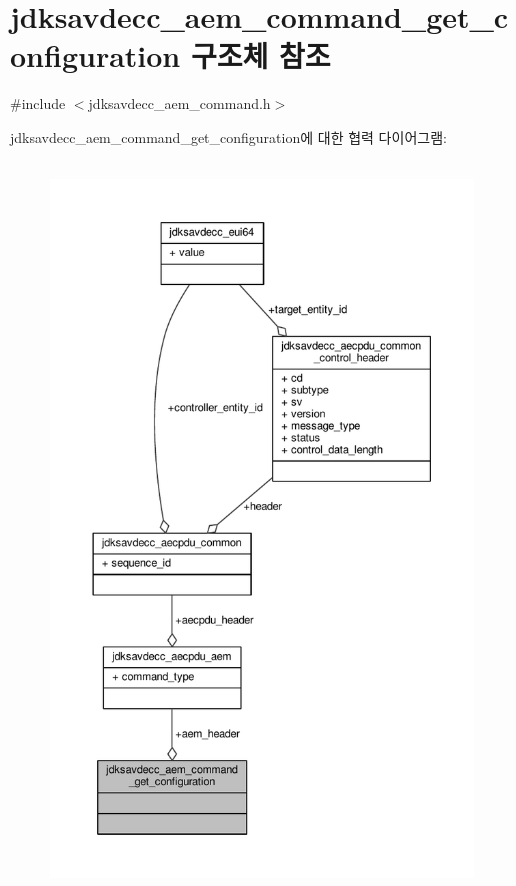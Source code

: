 \hypertarget{structjdksavdecc__aem__command__get__configuration}{}\section{jdksavdecc\+\_\+aem\+\_\+command\+\_\+get\+\_\+configuration 구조체 참조}
\label{structjdksavdecc__aem__command__get__configuration}


{\ttfamily \#include $<$jdksavdecc\+\_\+aem\+\_\+command.\+h$>$}



jdksavdecc\+\_\+aem\+\_\+command\+\_\+get\+\_\+configuration에 대한 협력 다이어그램\+:
\nopagebreak
\begin{figure}[H]
\begin{center}
\leavevmode
\includegraphics[height=550pt]{structjdksavdecc__aem__command__get__configuration__coll__graph}
\end{center}
\end{figure}
